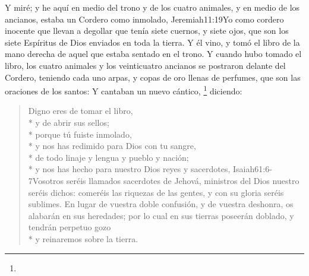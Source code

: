 Y miré; y he aquí en medio del trono y de los cuatro animales, y en medio de los ancianos, estaba un Cordero como inmolado,%
					  {Jeremiah}{11:19}{Yo como cordero inocente que llevan a degollar}
 que tenía siete cuernos, y siete ojos, que son los siete Espíritus de Dios enviados en toda la tierra.%
Y él vino, y tomó el libro de la mano derecha de aquel que estaba sentado en el trono. %
Y cuando hubo tomado el libro, los cuatro animales y los veinticuatro ancianos se postraron delante del Cordero, teniendo cada uno arpas, y copas de oro llenas de perfumes, que son las oraciones de los santos:%
Y cantaban un nuevo cántico,%
	\footnote{ %
	}
 diciendo:
\begin{verse}
Digno eres de tomar el libro,\\*
\vin y de abrir sus sellos;\\* 
porque tú fuiste inmolado,\\*
\vin y nos has redimido para Dios con tu sangre,\\* 
\vin de todo linaje y lengua y pueblo y nación;\\* %
y nos has hecho para nuestro Dios reyes y sacerdotes,%
				{Isaiah}{61:6-7}{Vosotros seréis llamados sacerdotes de Jehová, ministros del Dios nuestro seréis dichos: comeréis las riquezas de las gentes, y con su gloria seréis sublimes. En lugar de vuestra doble confusión, y de vuestra deshonra, os alabarán en sus heredades; por lo cual en sus tierras poseerán doblado, y tendrán perpetuo gozo}\\*
\vin y reinaremos sobre la tierra.
\end{verse}

